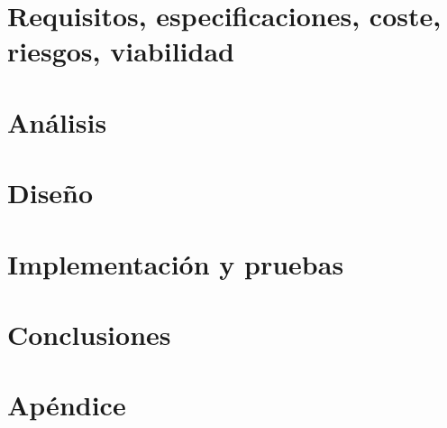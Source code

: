 \documentclass[twoside,spanish,a4paper,12pt]{tfg}
\begin{document}
\chapter{Requisitos, especificaciones, coste, riesgos, viabilidad}


\chapter{Análisis}


\chapter{Diseño}


\chapter{Implementación y pruebas}

\chapter{Conclusiones}




\pagestyle{appendix}

\appendix
\chapter{Apéndice}




\end{document}
